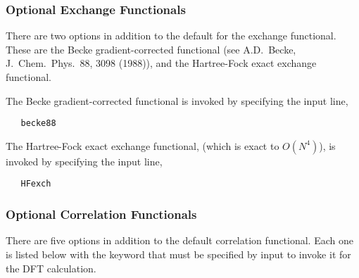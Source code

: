
\subsubsection{Optional Exchange Functionals}

There are two options in addition to the default for the exchange functional.
These are the Becke gradient-corrected functional (see A.D.~Becke, 
J.~Chem.~Phys.~88, 3098 (1988)), and the Hartree-Fock
exact exchange functional.

The Becke gradient-corrected functional is invoked by specifying the input
line,

\begin{verbatim}
   becke88
\end{verbatim}

The Hartree-Fock exact exchange functional, (which is exact to $O(N^4)$),
is invoked by specifying the input line,

\begin{verbatim}
   HFexch
\end{verbatim}


\subsubsection{Optional Correlation Functionals}

There are five options in addition to the default correlation functional.
Each one is listed below with the keyword that must be specified by input
to invoke it for the DFT calculation.

